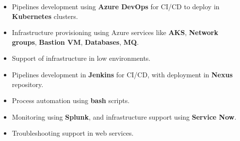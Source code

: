 \documentclass[letterpaper]{style} %
\begin{document}


\begin{itemize}
	\item Pipelines development using \textbf{Azure DevOps} for CI/CD to deploy in \textbf{Kubernetes} clusters.
	\item Infrastructure provisioning using Azure services like \textbf{AKS}, \textbf{Network groups}, \textbf{Bastion VM}, \textbf{Databases}, \textbf{MQ}.
	\item Support of infrastructure in low environments.
\end{itemize}

\divider

\begin{itemize}
	\item Pipelines development in \textbf{Jenkins} for CI/CD, with deployment in \textbf{Nexus} repository.
	\item Process automation using \textbf{bash} scripts.
	\item Monitoring using \textbf{Splunk}, and infrastructure support using \textbf{Service Now}.
	\item Troubleshooting support in web services.
\end{itemize}



\end{document}
